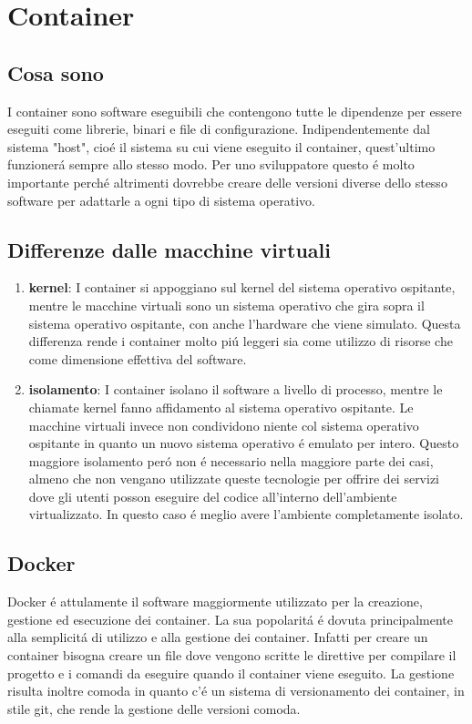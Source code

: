 \section{Container}
\subsection{Cosa sono}
\cite{container}I container sono software eseguibili che contengono tutte le dipendenze per essere eseguiti come librerie, binari e file di configurazione. Indipendentemente dal sistema "host", cioé il sistema su cui viene eseguito il container, quest'ultimo funzionerá sempre allo stesso modo. Per uno sviluppatore questo é molto importante perché altrimenti dovrebbe creare delle versioni diverse dello stesso software per adattarle a ogni tipo di sistema operativo.
\subsection{Differenze dalle macchine virtuali}
\begin{enumerate}
  \item \textbf{kernel}: I container si appoggiano sul kernel del sistema operativo ospitante, mentre le macchine virtuali sono un sistema operativo che gira sopra il sistema operativo ospitante, con anche l'hardware che viene simulato. Questa differenza rende i container molto piú leggeri sia come utilizzo di risorse che come dimensione effettiva del software.
  \item \textbf{isolamento}: I container isolano il software a livello di processo, mentre le chiamate kernel fanno affidamento al sistema operativo ospitante. Le macchine virtuali invece non condividono niente col sistema operativo ospitante in quanto un nuovo sistema operativo é emulato per intero. Questo maggiore isolamento peró non é necessario nella maggiore parte dei casi, almeno che non vengano utilizzate queste tecnologie per offrire dei servizi dove gli utenti posson eseguire del codice all'interno dell'ambiente virtualizzato. In questo caso é meglio avere l'ambiente completamente isolato.
\end{enumerate}

\subsection{Docker}
\cite{docker}Docker é attulamente il software maggiormente utilizzato per la creazione, gestione ed esecuzione dei container. La sua popolaritá é dovuta principalmente alla semplicitá di utilizzo e alla gestione dei container. Infatti per creare un container bisogna creare un file dove vengono scritte le direttive per compilare il progetto e i comandi da eseguire quando il container viene eseguito. La gestione risulta inoltre comoda in quanto c'é un sistema di versionamento dei container, in stile git, che rende la gestione delle versioni comoda.

